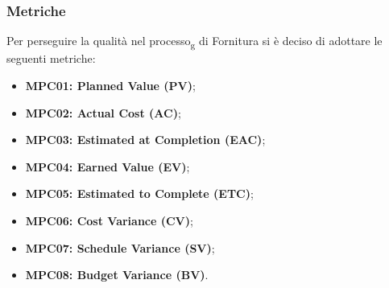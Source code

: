\subsubsection{Metriche}
Per perseguire la qualità nel processo\textsubscript{g} di Fornitura si è deciso di adottare le seguenti metriche:
\begin{itemize}
    \item \textbf{MPC01: Planned Value (PV)};
    \item \textbf{MPC02: Actual Cost (AC)};
    \item \textbf{MPC03: Estimated at Completion (EAC)};
    \item \textbf{MPC04: Earned Value (EV)};
    \item \textbf{MPC05: Estimated to Complete (ETC)};
    \item \textbf{MPC06: Cost Variance (CV)};
    \item \textbf{MPC07: Schedule Variance (SV)};
    \item \textbf{MPC08: Budget Variance (BV)}.
\end{itemize}

